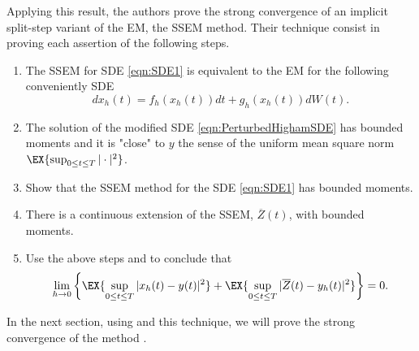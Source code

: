 	Applying this result, the authors prove the strong convergence of an implicit split-step variant of the EM, the
SSEM method. 
Their technique consist in proving each assertion of the following steps.
\begin{enumerate}[\bf{Step} 1:]
	\item
		\label{stp:EMCorrespondence}
		The SSEM for SDE \eqref{eqn:SDE1} is equivalent to the EM for the following conveniently SDE
		\begin{equation}\label{eqn:PerturbedHighamSDE}
			dx_h(t)= f_h(x_h(t))dt +g_h(x_h(t))dW(t).
		\end{equation}
	\item\label{stp:PerturbedSolution}
			The solution of the modified SDE \eqref{eqn:PerturbedHighamSDE} has bounded moments and it is 
			"close" to  $y$ the sense of the uniform mean square norm 
			$
				\EX{\sup_{0\leq t\leq T}|\cdot|^2}
			$.
	\item
	\label{stp:MethodBoundedMoments}
		Show that the SSEM method for the SDE \eqref{eqn:SDE1} has bounded moments.
	\item
		There is a continuous extension of the SSEM, $\overline{Z}(t)$, with bounded moments.
	\item
		Use the above steps and  to conclude that
		\begin{equation}
			\lim_{h\to 0}
			\left\{
				\EX{\sup_{0\leq t\leq T}|x_h(t)-y(t)|^2}
			+
			\EX{\sup_{0\leq t\leq T}|\overline{Z}(t) -y_h(t)|^2}
			\right\}=0.
		\end{equation}
\end{enumerate}

	In the next section, using  and this technique, we will prove the strong convergence of the 
\SM method .
%